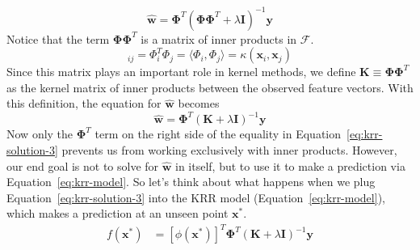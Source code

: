 \documentclass[11pt]{article}
\begin{document}
\begin{equation}
	\mathbf{\hat{w}}
=
	\boldsymbol{\Phi}^T
	\left(
		\boldsymbol{\Phi}
		\boldsymbol{\Phi}^T
	+
		\lambda
		\mathbf{I}
	\right)^{-1}
	\mathbf{y}
\end{equation}
Notice that the term $\boldsymbol{\Phi}\boldsymbol{\Phi}^T$ is a matrix of
inner products in $\mathcal{F}$. 
\begin{equation}
	[\boldsymbol{\Phi\Phi}^T]_{ij}
=
	\Phi_i^T\Phi_j
=
	\langle
		\Phi_i, \Phi_j
	\rangle
=
	\kappa(\mathbf{x}_i, \mathbf{x}_j)
\end{equation}
Since this matrix plays an important role in kernel methods, we define
$\mathbf{K} \equiv \boldsymbol{\Phi\Phi}^T$ as the kernel matrix of inner
products between the observed feature vectors.
With this definition, the equation for $\mathbf{\hat{w}}$ becomes
\begin{equation}
	\label{eq:krr-solution-3}
	\mathbf{\hat{w}}
=
	\boldsymbol{\Phi}^T
	\left(
		\mathbf{K}
	+
		\lambda
		\mathbf{I}
	\right)^{-1}
	\mathbf{y}
\end{equation}
Now only the $\boldsymbol{\Phi}^T$ term on the right side of the equality in
Equation~\ref{eq:krr-solution-3} prevents us from working exclusively with
inner products.
However, our end goal is not to solve for $\mathbf{\hat{w}}$ in itself, but to
use it to make a prediction via Equation~\ref{eq:krr-model}.
So let's think about what happens when we plug Equation~\ref{eq:krr-solution-3}
into the KRR model (Equation~\ref{eq:krr-model}), which makes a prediction at
an unseen point $\mathbf{x^*}$.
\begin{align}
	f(\mathbf{x}^*)
&=
	[\phi(\mathbf{x}^*)]^T
	\boldsymbol{\Phi}^T
	\left(
		\mathbf{K}
	+
		\lambda
		\mathbf{I}
	\right)^{-1}
	\mathbf{y}
\end{align}
\end{document}
